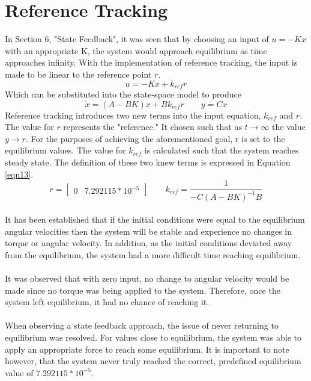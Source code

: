 \documentclass[12pt]{article}
\begin{document}
\section{Reference Tracking}
In Section 6, "State Feedback", it was seen that by choosing an input of $u=-Kx$ with an appropriate K, the system would approach equilibrium as time approaches infinity. With the implementation of reference tracking, the input is made to be linear to the reference point $r$. 
\\
\begin{equation}
\label{eqn11}
u = -K x + k_{ref} r
\end{equation}
Which can be substituted into the state-space model to produce
\begin{equation}
\label{eqn12}
\dot{x} = (A-BK)x + B k_{ref} r
\qquad
y = Cx
\end{equation}
Reference tracking introduces two new terms into the input equation, $k_{ref}$ and $r$. The value for $r$ represents the "reference." It chosen such that as $t \rightarrow \infty$ the value $y \rightarrow r$. For the purposes of achieving the aforementioned goal, r is set to the equilibrium values. The value for $k_{ref}$ is calculated such that the system reaches steady state. The definition of these two knew terms is expressed in Equation \ref{eqn13}.
\begin{equation}
\label{eqn13}
r = \begin{bmatrix} 0 & 7.292115*10^{-5}\end{bmatrix}
\qquad
k_{ref} = \frac{1}{-C(A-BK)^{-1} B}
\end{equation}
\\
It has been established that if the initial conditions were equal to the equilibrium  angular velocities then the system will be stable and experience no changes in torque or angular velocity. In addition, as the initial conditions deviated away from the equilibrium, the system had a more difficult time reaching equilibrium. 
\\ \\
It was observed that with zero input, no change to angular velocity would be made since no torque was being applied to the system. Therefore, once the system left equilibrium, it had no chance of reaching it. 
\\ \\
When observing a state feedback approach, the issue of never returning to equilibrium was resolved. For values close to equilibrium, the system was able to apply an appropriate force to reach some equilibrium. It is important to note however, that the system never truly reached the correct, predefined equilibrium value of $7.292115*10^{-5}$. 
\end{document}
